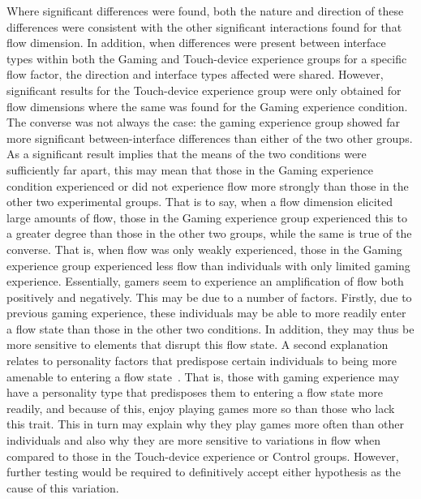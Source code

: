 Where significant differences were found, both the nature and direction of these differences were consistent with the other significant interactions found for that flow dimension. In addition, when differences were present between interface types within both the Gaming and Touch-device experience groups for a specific flow factor, the direction and interface types affected were shared. However, significant results for the Touch-device experience group were only obtained for flow dimensions where the same was found for the Gaming experience condition. The converse was not always the case: the gaming experience group showed far more significant between-interface differences than either of the two other groups. As a significant result implies that the means of the two conditions were sufficiently far apart, this may mean that those in the Gaming experience condition experienced or did not experience flow more strongly than those in the other two experimental groups. That is to say, when a flow dimension elicited large amounts of flow, those in the Gaming experience group experienced this to a greater degree than those in the other two groups, while the same is true of the converse. That is, when flow was only weakly experienced, those in the Gaming experience group experienced less flow than individuals with only limited gaming experience. Essentially, gamers seem to experience an amplification of flow both positively and negatively. This may be due to a number of factors. Firstly, due to previous gaming experience, these individuals may be able to more readily enter a flow state than those in the other two conditions. In addition, they may thus be more sensitive to elements that disrupt this flow state. A second explanation relates to personality factors that predispose certain individuals to being more amenable to entering a flow state~\citep{Csik90}. That is, those with gaming experience may have a personality type that predisposes them to entering a flow state more readily, and because of this, enjoy playing games more so than those who lack this trait. This in turn may explain why they play games more often than other individuals and also why they are more sensitive to variations in flow when compared to those in the Touch-device experience or Control groups. However, further testing would be required to definitively accept either hypothesis as the cause of this variation.

